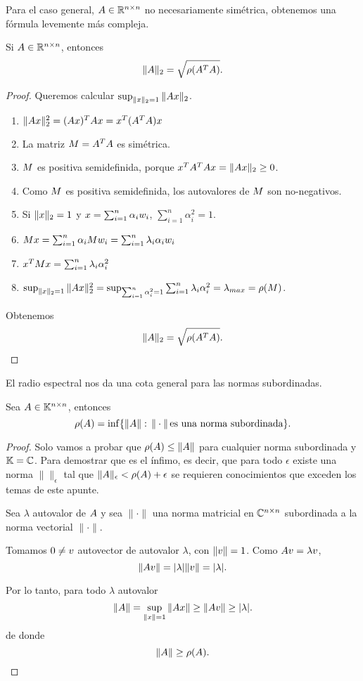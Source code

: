 Para el caso general, $\Ab\in \R^{n\times n}$ no necesariamente simétrica, obtenemos una fórmula levemente más compleja.

\begin{prop}
Si  $\Ab\in \Rnn$, entonces
$$
\|\Ab\|_2=\sqrt{\rho(\Ab^T\Ab)}.$$
\end{prop}

\begin{proof}
Queremos calcular $\sup_{\|\xb\|_2=1}\|\Ab\xb\|_2$.

\begin{enumerate}
\item $\|\Ab\xb\|_2^2=(\Ab\xb)^T\Ab\xb=\xb^T(\Ab^T\Ab)\xb$
\item La matriz $\Mb=\Ab^T\Ab$ es simétrica.
\item $\Mb$ es positiva semidefinida, porque $\xb^T \Ab^T \Ab \xb = \|\Ab \xb\|_2 \ge 0$.
\item Como $\Mb$ es positiva semidefinida, los autovalores de $\Mb$ son no-negativos.
\item Si $\|\xb\|_2 = 1$ y $\xb=\sum_{i=1}^n\alpha_i\wb_i$, $\sum_{i=1}^n\alpha_i^2 = 1$.
\item $\Mb\xb=\sum_{i=1}^n\alpha_i\Mb\wb_i=\sum_{i=1}^n\lambda_i\alpha_i\wb_i$
\item $\xb^T\Mb\xb=\sum_{i=1}^n\lambda_i\alpha_i^2$
\item $\sup_{\|\xb\|_2=1}\|\Ab\xb\|_2^2=\sup_{\sum_{i=1}^n\alpha_i^2=1}\sum_{i=1}^n\lambda_i\alpha_i^2=\lambda_{max}=\rho(\Mb)$.
\end{enumerate}

Obtenemos
$$
\|\Ab\|_2=\sqrt{\rho(\Ab^T\Ab)}.
$$
\end{proof}

El radio espectral nos da una cota general para las normas subordinadas.

\begin{prop}
 \label{prop:infmat=rho}
Sea $\Ab\in\Knn$, entonces
$$
\rho(\Ab)=\inf
\{\|\Ab\|:\, \|\cdot \|\,  \mbox{es una norma subordinada}\}.$$
\end{prop}

\begin{proof}
Solo vamos a probar que  $\rho(\Ab)\le \|\Ab\|$ para cualquier norma subordinada y  $\mathbb K=\mathbb C$. Para demostrar que es el ínfimo, es decir, que para todo $\epsilon$ existe una norma $\| \|_{\epsilon}$ tal que $\|\Ab\|_{\epsilon} < \rho(\Ab) + \epsilon$ se requieren conocimientos que exceden los temas de este apunte.

 Sea $\lambda$ autovalor de $\Ab$ y sea $\|\cdot\|$ una norma matricial en $\mathbb C^{n\times n}$ subordinada a la norma vectorial  $\|\cdot\|$.

 Tomamos $\cero\neq\vb$ autovector de autovalor $\lambda$, con  $\|\vb\|=1$. Como $\Ab\vb=\lambda\vb$,
 $$ \|\Ab\vb\| = |\lambda|\|\vb\|=|\lambda|.$$
 
  Por lo tanto, para todo $\lambda$ autovalor
 $$
 \|\Ab\|=\sup_{\|\xb\|=1}\|\Ab\xb\|\ge \|\Ab\vb\|\ge |\lambda|.
 $$
 de donde
 $$
 \|\Ab\|\ge \rho(\Ab).
 $$

\end{proof}

